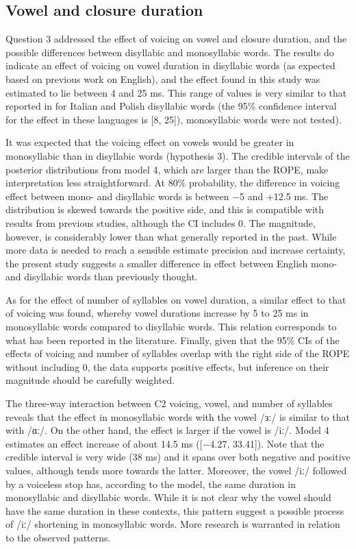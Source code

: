 \documentclass[12pt,a4paper,]{article}
\begin{document}
\hypertarget{vowel-and-closure-duration}{%
\subsection{Vowel and closure
duration}\label{vowel-and-closure-duration}}

\label{s:vc-disc}

Question 3 addressed the effect of voicing on vowel and closure
duration, and the possible differences between disyllabic and
monosyllabic words. The results do indicate an effect of voicing on
vowel duration in disyllabic words (as expected based on previous work
on English), and the effect found in this study was estimated to lie
between 4 and 25 ms. This range of values is very similar to that
reported in \citet{coretta2019k} for Italian and Polish disyllabic words
(the 95\% confidence interval for the effect in these languages is {[}8,
25{]}), monosyllabic words were not tested).

It was expected that the voicing effect on vowels would be greater in
monosyllabic than in disyllabic words (hypothesis 3). The credible
intervals of the posterior distributions from model 4, which are larger
than the ROPE, make interpretation less straightforward. At 80\%
probability, the difference in voicing effect between mono- and
disyllabic words is between −5 and +12.5 ms. The distribution is skewed
towards the positive side, and this is compatible with results from
previous studies, although the CI includes 0. The magnitude, however, is
considerably lower than what generally reported in the past. While more
data is needed to reach a sensible estimate precision and increase
certainty, the present study suggests a smaller difference in effect
between English mono- and disyllabic words than previously thought.

As for the effect of number of syllables on vowel duration, a similar
effect to that of voicing was found, whereby vowel durations increase by
5 to 25 ms in monosyllabic words compared to disyllabic words. This
relation corresponds to what has been reported in the literature.
Finally, given that the 95\% CIs of the effects of voicing and number of
syllables overlap with the right side of the ROPE without including 0,
the data supports positive effects, but inference on their magnitude
should be carefully weighted.

The three-way interaction between C2 voicing, vowel, and number of
syllables reveals that the effect in monosyllabic words with the vowel
/ɜː/ is similar to that with /ɑː/. On the other hand, the effect is
larger if the vowel is /iː/. Model 4 estimates an effect increase of
about 14.5 ms ({[}−4.27, 33.41{]}). Note that the credible interval is
very wide (38 ms) and it spans over both negative and positive values,
although tends more towards the latter. Moreover, the vowel /iː/
followed by a voiceless stop has, according to the model, the same
duration in monosyllabic and disyllabic words. While it is not clear why
the vowel should have the same duration in these contexts, this pattern
suggest a possible process of /iː/ shortening in monosyllabic words.
More research is warranted in relation to the observed patterns.
\end{document}
